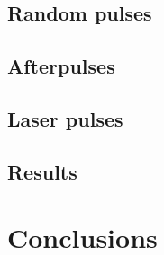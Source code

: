 \subsection{Random pulses}

\subsection{Afterpulses}

\subsection{Laser pulses}

\subsection{Results}

\section{Conclusions}

